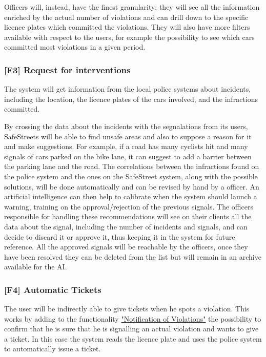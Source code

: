 Officers will, instead, have the finest granularity: they will see all the information enriched by the actual number of violations and can drill down to the specific licence plates which committed the violations.
They will also have more filters available with respect to the users, for example the possibility to see which cars committed most violations in a given period.

\subsubsection[Request for interventions]{[F3] Request for interventions\hypertarget{sec:f3}{}}
\label{sec:request_for_interventions}
The system will get information from the local police systems about incidents, including the location, the licence plates of the cars involved, and the infractions committed.

By crossing the data about the incidents with the segnalations from its users, SafeStreets will be able to find unsafe areas and also to suppose a reason for it and make suggestions.
For example, if a road has many cyclists hit and many signals of cars parked on the bike lane, it can suggest to add a barrier between the parking lane and the road.
The correlations between the infractions found on the police system and the ones on the SafeStreet system, along with the possible solutions, will be done automatically and can be revised by hand by a officer.
An artificial intelligence can then help to calibrate when the system should launch a warning, training on the approval/rejection of the previous signals.
\clearpage
The officers responsible for handling these recommendations will see on their clients all the data about the signal,
including the number of incidents and signals, and can decide to discard it or approve it, thus keeping it in the system for future reference.
All the approved signals will be reachable by the officers, once they have been resolved they can be deleted from the list but will remain in an archive available for the AI.


\subsubsection[Automatic Tickets]{[F4] Automatic Tickets\hypertarget{sec:f4}{}}
\label{sec:automatic_tickets}
The user will be indirectly able to give tickets when he spots a violation. This works by adding to the functionality
\hyperref[sec:notification_of_violations]{"Notification of Violations"}
the possibility to confirm that he is sure that he is signalling an actual violation and wants to give a ticket.
In this case the system reads the licence plate and uses the police system to automatically issue a ticket.

